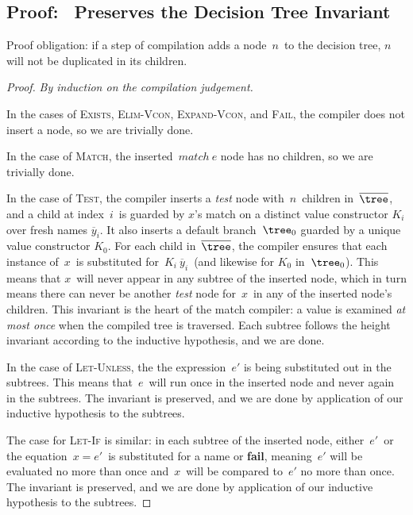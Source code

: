 \documentclass[runningheads]{llncs}
\begin{document}
\subsection{Proof: \Compile~Preserves the Decision Tree Invariant}

      Proof obligation: if a step of compilation adds a node~$n$~to the decision
      tree, $n$ will not be duplicated in its children. %

\begin{proof}

      \textit{By induction on the compilation judgement. }%

      In the cases of \textsc{Exists}, \textsc{Elim-Vcon}, \textsc{Expand-Vcon},
      and \textsc{Fail}, the compiler does not insert a node, so we are
      trivially done. %

      In the case of \textsc{Match}, the inserted~$\mathit{match~e}$ node has no
      children, so we are trivially done. %

      In the case of \textsc{Test}, the compiler inserts a \textit{test} node
      with~$n$~children in~$\overline{\tree}$, and a child at index~$i$~is
      guarded by $x$'s match on a distinct value constructor $K_i$ over fresh
      names $\overline{y}_i$. %
      It also inserts a default branch~$\tree_0$ guarded by a unique value
      constructor $K_0$.%
      For each child in~$\overline{\tree}$, the compiler ensures that each
      instance of~$x$~is substituted for~$K_i~\overline{y}_i$~(and likewise for
      $K_0$ in~$\tree_0$).%
      This means that $x$~will never appear in any subtree of the inserted node,
      which in turn means there can never be another \textit{test} node
      for~$x$~in any of the inserted node's children. %
       This invariant is the heart of the match compiler: a value is examined
      \textit{at most once} when the compiled tree is traversed. %
      Each subtree follows the height invariant according to the inductive
      hypothesis, and we are done. %

      In the case of \textsc{Let-Unless}, the the expression~$e'$ is being
      substituted out in the subtrees. %
      This means that~$e$~will run once in the inserted node and never again in
      the subtrees. %
      The invariant is preserved, and we are done by application of our
      inductive hypothesis to the subtrees. 
      
      The case for \textsc{Let-If} is similar: in each subtree of the inserted
      node, either~$e'$~or the equation~$x = e'$~is substituted for a name or
      \textbf{fail}, meaning~$e'$ will be evaluated no more than once
      and~$x$~will be compared to~$e'$ no more than once.  The invariant is
      preserved, and we are done by application of our inductive hypothesis to
      the subtrees. 
\end{proof}
\end{document}
